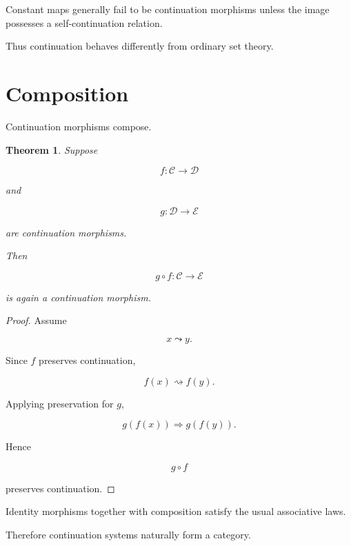 \documentclass[13pt,openany]{book}
\theoremstyle{plain}
\newtheorem{theorem}{Theorem}[chapter]
\theoremstyle{definition}
\begin{document}
Constant maps generally fail to be continuation morphisms unless the image
possesses a self-continuation relation.

Thus continuation behaves differently from ordinary set theory.


\section{Composition}

Continuation morphisms compose.

\begin{theorem}

Suppose

\[
f:\mathcal C\rightarrow\mathcal D
\]

and

\[
g:\mathcal D\rightarrow\mathcal E
\]

are continuation morphisms.

Then

\[
g\circ f
:
\mathcal C
\rightarrow
\mathcal E
\]

is again a continuation morphism.

\end{theorem}

\begin{proof}

Assume

\[
x\leadsto y.
\]

Since \(f\) preserves continuation,

\[
f(x)\rightsquigarrow f(y).
\]

Applying preservation for \(g\),

\[
g(f(x))
\Longrightarrow
g(f(y)).
\]

Hence

\[
g\circ f
\]

preserves continuation.

\end{proof}


Identity morphisms together with composition satisfy the usual associative
laws.

Therefore continuation systems naturally form a category.

\end{document}
